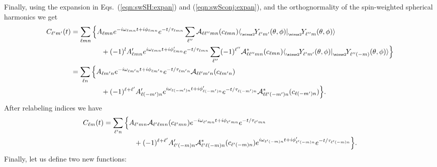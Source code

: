 \documentclass[11pt]{article}
\newcommand{\braket}[2]{\langle #1|#2\rangle}
\newcommand{\swY}[4][]{{}_{{}_{#2}}\!Y^{#1}_{#3}(#4)}
\begin{document}
\noindent
Finally, using the expansion in Eqs.~(\ref{eqn:swSH:expan}) and (\ref{eqn:swSconj:expan}), and
the orthognormality of the spin-weighted spherical harmonics we get
\begin{equation}
\begin{aligned} \label{clm:eq3}
C_{\ell^\prime{m}^\prime}(t) & = \sum_{\ell{m}n} \Big\{ 
   A_{\ell{m}n} e^{-i\omega_{\ell{m}n}t+i\phi_{\ell{m}n}}e^{-t/\tau_{\ell{m}n}}
    \sum_{\ell^{\prime\prime}} \mathcal{A}_{\ell\ell^{\prime\prime}mn}(c_{\ell{m}n})
    \braket{\swY{\minus 2}{\ell^\prime{m}^\prime}{\theta,\phi}}{\swY{\minus 2}{\ell^{\prime\prime}m}{\theta,\phi}} \\
& {} \hspace{0.6in}
  + (-1)^lA^\prime_{\ell{m}n} e^{i\omega_{\ell{m}n}t+i\phi^\prime_{\ell{m}n}}e^{-t/\tau_{\ell{m}n}}
    \sum_{\ell^{\prime\prime}} (-1)^{\ell^{\prime\prime}} \mathcal{A}^{*}_{\ell\ell^{\prime\prime}mn}(c_{\ell{m}n})
    \braket{\swY{\minus 2}{\ell^\prime{m}^\prime}{\theta,\phi}}{\swY{\minus 2}{\ell^{\prime\prime}(-m)}{\theta,\phi}} \Big\} \\ 
 & = \sum_{\ell{n}} \Big\{ 
   A_{\ell{m^\prime}n} e^{-i\omega_{\ell{m^\prime}n}t+i\phi_{\ell{m^\prime}n}}e^{-t/\tau_{\ell{m^\prime}n}}
    \mathcal{A}_{\ell\ell^\prime{m^\prime}n}(c_{\ell{m^\prime}n}) \\
& {} \hspace{0.6in}
  + (-1)^{\ell+\ell^\prime}A^\prime_{\ell(-m^\prime)n} e^{i\omega_{\ell(-m^\prime)n}t+i\phi^\prime_{\ell(-m^\prime)n}}e^{-t/\tau_{\ell(-m^\prime)n}}
    \mathcal{A}^{*}_{\ell\ell^\prime(-m^\prime)n}(c_{\ell(-m^\prime)n}) \Big\}.
\end{aligned}
\end{equation}
After relabeling indices we have
\begin{equation}
\begin{aligned}
 C_{\ell{m}}(t) & = \sum_{\ell^\prime{n}} \Big\{ 
   A_{\ell^\prime{m}n}\mathcal{A}_{\ell^\prime\ell{m}n}(c_{\ell^\prime{m}n})
    e^{-i\omega_{\ell^\prime{m}n}t+i\phi_{\ell^\prime{m}n}}e^{-t/\tau_{\ell^\prime{m}n}} \\
& {} \hspace{0.6in}
  + (-1)^{\ell+\ell^\prime}A^\prime_{\ell^\prime(-m)n}
    \mathcal{A}^{*}_{\ell^\prime\ell(-m)n}(c_{\ell^\prime(-m)n})
    e^{i\omega_{\ell^\prime(-m)n}t+i\phi^\prime_{\ell^\prime(-m)n}}e^{-t/\tau_{\ell^\prime(-m)n}} \Big\}.
\end{aligned}
\end{equation}
Finally, let us define two new functions:
\end{document}
